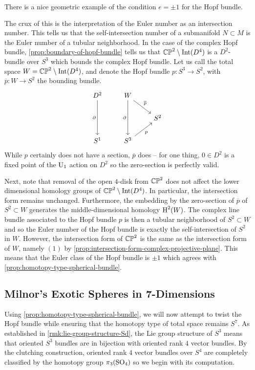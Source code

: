\begin{remark}
	There is a nice geometric example of the condition $e=\pm 1$ for the Hopf bundle.

	The crux of this is the interpretation of the Euler number as an intersection number. This tells us that the self-intersection number of a submanifold $N\subset M$ is the Euler number of a tubular neighborhood.
	In the case of the complex Hopf bundle, \cref{prop:boundary-of-hopf-bundle} tells us that $\mathbb{CP}^2\setminus \operatorname{Int}(D^4)$ is a $D^2$-bundle over $S^3$ which bounds the complex Hopf bundle. Let us call the total space $W=\mathbb{CP}^2\setminus \operatorname{Int}(D^4)$, and denote the Hopf bundle $p : S^3 \to S^2$, with $\overline{p} : W \to S^2$ the bounding bundle.
	\[
		\begin{tikzcd}
			D^2 & W & \\
			& & S^2\\
			S^1 & S^3 &
			\arrow["\partial"', from=1-1, to=3-1]
			\arrow["\partial"', from=1-2, to=3-2]
			\arrow["p"', from=3-2, to=2-3]
			\arrow["\overline{p}", from=1-2, to=2-3]
		\end{tikzcd}
	\]
	While $p$ certainly does not have a section, $\overline{p}$ does -- for one thing, $0\in D^2$ is a fixed point of the $\mathrm{U}_1$ action on $D^2$ so the zero-section is perfectly valid.

	Next, note that removal of the open $4$-disk from $\mathbb{CP}^2$ does not affect the lower dimensional homology groups of $\mathbb{CP}^2\setminus \operatorname{Int}(D^4)$. In particular, the intersection form remains unchanged.
	Furthermore, the embedding by the zero-section of $\overline{p}$ of $S^2\subset W$ generates the middle-dimensional homology $\operatorname{H}^2(W)$. The complex line bundle associated to the Hopf bundle $p$ is then a tubular neighborhood of $S^2\subset W$ and so the Euler number of the Hopf bundle is exactly the self-intersection of $S^2$ in $W$. However, the intersection form of $\mathbb{CP}^2$ is the same as the intersection form of $W$, namely $(1)$ by \cref{prop:intersection-form-complex-projective-plane}. This means that the Euler class of the Hopf bundle is $\pm 1$ which agrees with \cref{prop:homotopy-type-spherical-bundle}.
\end{remark}

\subsection{Milnor's Exotic Spheres in 7-Dimensions}

Using \cref{prop:homotopy-type-spherical-bundle}, we will now attempt to twist the Hopf bundle while ensuring that the homotopy type of total space remains $S^7$. As established in \cref{rmk:lie-group-structure-Sd}, the Lie group structure of $S^3$ means that oriented $S^3$ bundles are in bijection with oriented rank $4$ vector bundles. By the clutching construction, oriented rank $4$ vector bundles over $S^4$ are completely classified by the homotopy group $\pi_3(\mathrm{SO}_4)$ so we begin with its computation.

